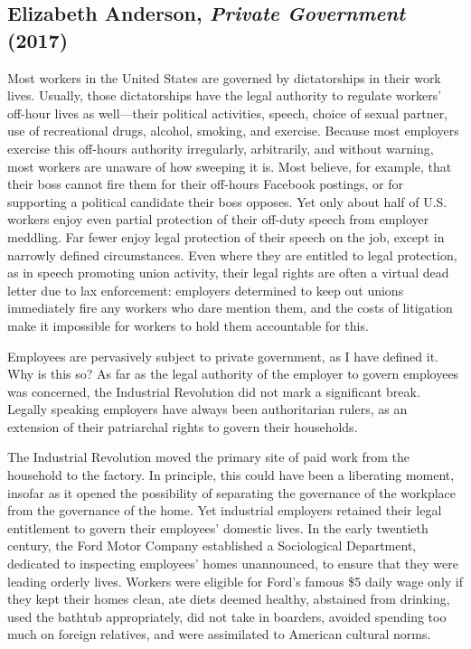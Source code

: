 \documentclass[
  letterpaper,
  11pt,
  DIV=9,
  openright]{scrbook}
\begin{document}
\subsection{\texorpdfstring{Elizabeth Anderson, \emph{Private
Government}
(2017)}{Elizabeth Anderson, Private Government (2017)}}\label{elizabeth-anderson-private-government-2017}

Most workers in the United States are governed by dictatorships in their
work lives. Usually, those dictatorships have the legal authority to
regulate workers' off-hour lives as well---their political activities,
speech, choice of sexual partner, use of recreational drugs, alcohol,
smoking, and exercise. Because most employers exercise this off-hours
authority irregularly, arbitrarily, and without warning, most workers
are unaware of how sweeping it is. Most believe, for example, that their
boss cannot fire them for their off-hours Facebook postings, or for
supporting a political candidate their boss opposes. Yet only about half
of U.S. workers enjoy even partial protection of their off-duty speech
from employer meddling. Far fewer enjoy legal protection of their speech
on the job, except in narrowly defined circumstances. Even where they
are entitled to legal protection, as in speech promoting union activity,
their legal rights are often a virtual dead letter due to lax
enforcement: employers determined to keep out unions immediately fire
any workers who dare mention them, and the costs of litigation make it
impossible for workers to hold them accountable for this.

Employees are pervasively subject to private government, as I have
defined it. Why is this so? As far as the legal authority of the
employer to govern employees was concerned, the Industrial Revolution
did not mark a significant break. Legally speaking employers have always
been authoritarian rulers, as an extension of their patriarchal rights
to govern their households.

The Industrial Revolution moved the primary site of paid work from the
household to the factory. In principle, this could have been a
liberating moment, insofar as it opened the possibility of separating
the governance of the workplace from the governance of the home. Yet
industrial employers retained their legal entitlement to govern their
employees' domestic lives. In the early twentieth century, the Ford
Motor Company established a Sociological Department, dedicated to
inspecting employees' homes unannounced, to ensure that they were
leading orderly lives. Workers were eligible for Ford's famous \$5 daily
wage only if they kept their homes clean, ate diets deemed healthy,
abstained from drinking, used the bathtub appropriately, did not take in
boarders, avoided spending too much on foreign relatives, and were
assimilated to American cultural norms.
\end{document}
